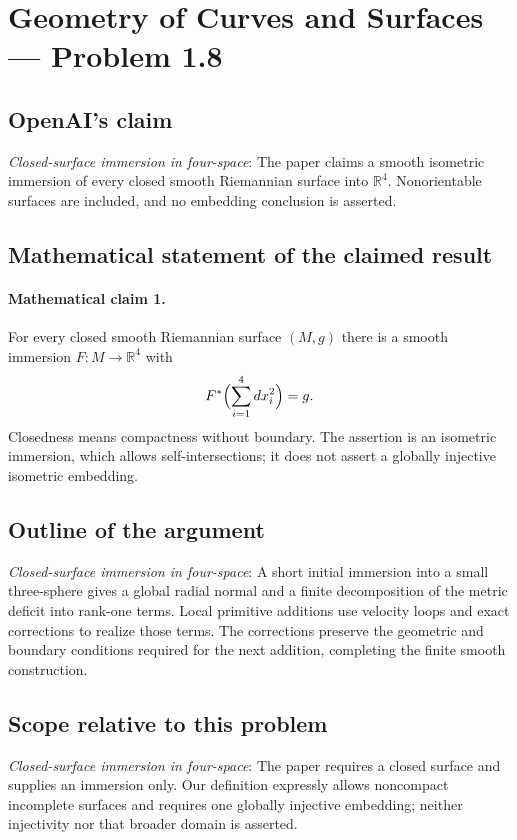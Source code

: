 \documentclass[11pt]{article}
\begin{document}
\section*{Geometry of Curves and Surfaces — Problem 1.8}

\subsection{OpenAI's claim}
\textit{Closed-surface immersion in four-space}: The paper claims a smooth isometric immersion of every closed smooth Riemannian surface into $\mathbb R^4$. Nonorientable surfaces are included, and no embedding conclusion is asserted.

\subsection{Mathematical statement of the claimed result}
\paragraph{Mathematical claim 1.} For every closed smooth Riemannian surface $(M,g)$ there is a smooth immersion $F:M\to\mathbb R^4$ with \[F^*\Bigl(\sum_{i=1}^4dx_i^2\Bigr)=g.\] Closedness means compactness without boundary. The assertion is an isometric immersion, which allows self-intersections; it does not assert a globally injective isometric embedding.

\subsection{Outline of the argument}
\textit{Closed-surface immersion in four-space}: A short initial immersion into a small three-sphere gives a global radial normal and a finite decomposition of the metric deficit into rank-one terms. Local primitive additions use velocity loops and exact corrections to realize those terms. The corrections preserve the geometric and boundary conditions required for the next addition, completing the finite smooth construction.

\subsection{Scope relative to this problem}
\textit{Closed-surface immersion in four-space}: The paper requires a closed surface and supplies an immersion only. Our definition expressly allows noncompact incomplete surfaces and requires one globally injective embedding; neither injectivity nor that broader domain is asserted.
\end{document}
